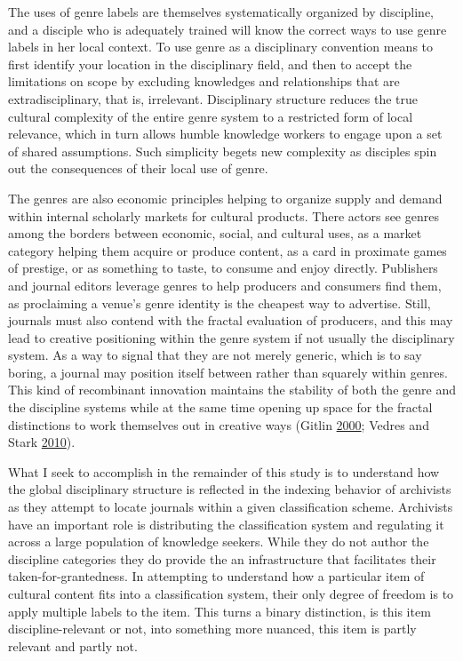 \documentclass[]{book}
\theoremstyle{definition}
\theoremstyle{definition}
\theoremstyle{definition}
\theoremstyle{remark}
\begin{document}
The uses of genre labels are themselves systematically organized by
discipline, and a disciple who is adequately trained will know the
correct ways to use genre labels in her local context. To use genre as a
disciplinary convention means to first identify your location in the
disciplinary field, and then to accept the limitations on scope by
excluding knowledges and relationships that are extradisciplinary, that
is, irrelevant. Disciplinary structure reduces the true cultural
complexity of the entire genre system to a restricted form of local
relevance, which in turn allows humble knowledge workers to engage upon
a set of shared assumptions. Such simplicity begets new complexity as
disciples spin out the consequences of their local use of genre.

The genres are also economic principles helping to organize supply and
demand within internal scholarly markets for cultural products. There
actors see genres among the borders between economic, social, and
cultural uses, as a market category helping them acquire or produce
content, as a card in proximate games of prestige, or as something to
taste, to consume and enjoy directly. Publishers and journal editors
leverage genres to help producers and consumers find them, as
proclaiming a venue's genre identity is the cheapest way to advertise.
Still, journals must also contend with the fractal evaluation of
producers, and this may lead to creative positioning within the genre
system if not usually the disciplinary system. As a way to signal that
they are not merely generic, which is to say boring, a journal may
position itself between rather than squarely within genres. This kind of
recombinant innovation maintains the stability of both the genre and the
discipline systems while at the same time opening up space for the
fractal distinctions to work themselves out in creative ways (Gitlin
\protect\hyperlink{ref-Gitlin2000Triumph}{2000}; Vedres and Stark
\protect\hyperlink{ref-Vedres2010Structural}{2010}).

What I seek to accomplish in the remainder of this study is to
understand how the global disciplinary structure is reflected in the
indexing behavior of archivists as they attempt to locate journals
within a given classification scheme. Archivists have an important role
is distributing the classification system and regulating it across a
large population of knowledge seekers. While they do not author the
discipline categories they do provide the an infrastructure that
facilitates their taken-for-grantedness. In attempting to understand how
a particular item of cultural content fits into a classification system,
their only degree of freedom is to apply multiple labels to the item.
This turns a binary distinction, is this item discipline-relevant or
not, into something more nuanced, this item is partly relevant and
partly not.
\end{document}
